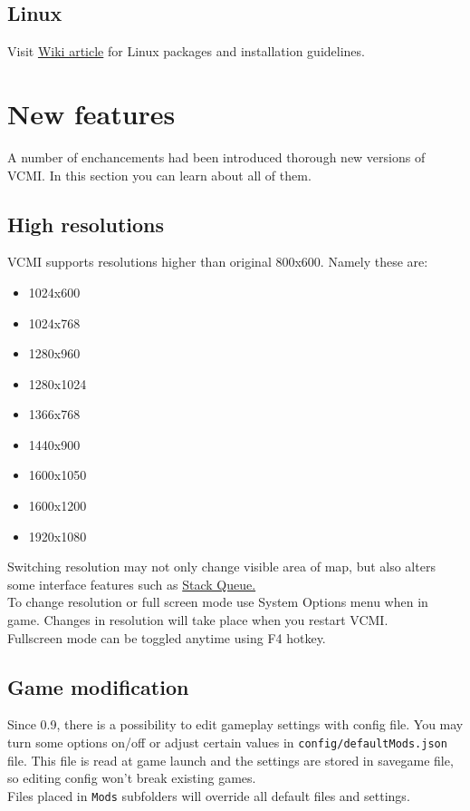 \documentclass[a4size,final]{article}
\begin{document}
\subsection{Linux}
Visit \href{http://wiki.vcmi.eu/index.php?title=Installation_on_Linux}{Wiki article} for Linux packages and installation guidelines.\\
\newpage
\section{New features}
A number of enchancements had been introduced thorough new versions of VCMI. In this section you can learn about all of them.
\subsection{High resolutions}
VCMI supports resolutions higher than original 800x600. Namely these are:
\begin{itemize}
\item 1024x600
\item 1024x768
\item 1280x960
\item 1280x1024
\item 1366x768 %
\item 1440x900
\item 1600x1050
\item 1600x1200
\item 1920x1080
\end{itemize}
Switching resolution may not only change visible area of map, but also alters some interface features such as \hyperref[Stack_Queue]{Stack Queue.}\\
To change resolution or full screen mode use System Options menu when in game. Changes in resolution will take place when you restart VCMI. \\
Fullscreen mode can be toggled anytime using F4 hotkey.
\label{Mods}
\subsection{Game modification}
Since 0.9, there is a possibility to edit gameplay settings with config file. You may turn some options on/off or adjust certain values in \texttt{config/defaultMods.json} file. This file is read at game launch and the settings are stored in savegame file, so editing config won't break existing games.\\
Files placed in \texttt{Mods} subfolders will override all default files and settings.
\label{Stack_Experience}
\end{document}
